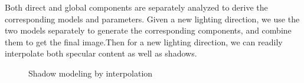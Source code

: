 Both direct and global components are separately analyzed to derive the
corresponding models and parameters. Given a new lighting direction, we use the
two models separately to generate the corresponding components, and combine them
to get the final image.Then for a new lighting direction, we can readily
interpolate both specular content as well as shadows.
% 
\begin{figure}[t]
\centering
{}
\label{fig:shadowmodel}
\caption{Shadow modeling by interpolation}
\end{figure}


